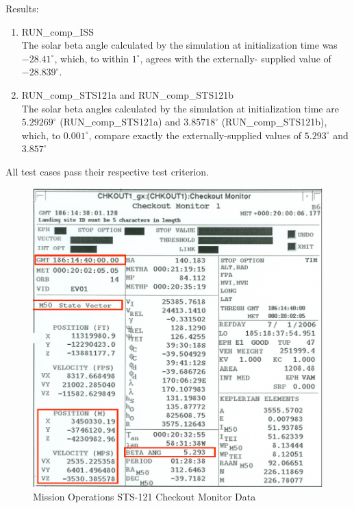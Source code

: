 \begin{description}
\item{Results:}
\begin{enumerate}
\item{RUN\_comp\_ISS}\\
 The solar beta angle calculated by the simulation at
initialization time was $-28.41^\circ$, which, to within $1^\circ$,
agrees with the externally- supplied value of $-28.839^\circ$.

\item{RUN\_comp\_STS121a and RUN\_comp\_STS121b} \\
The solar beta angles calculated by the simulation at initialization time are
$5.29269^\circ$ (RUN\_comp\_STS121a) and $3.85718^\circ$ (RUN\_comp\_STS121b),
which, to $0.001^\circ$, compare exactly the externally-supplied values
of $5.293^\circ$ and $3.857^\circ$
\end{enumerate}
All test cases pass their respective test criterion.
\end{description}


\begin{figure}
\centering
\includegraphics{figures/SOLAR_BETA_fig6}
\caption{Mission Operations STS-121 Checkout Monitor Data}
\label{fig:STS_121a}
\end{figure}


